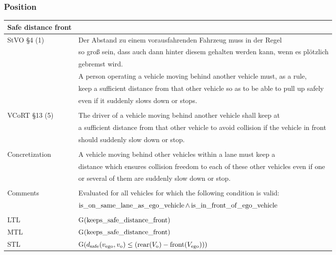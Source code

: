 \subsubsection{Position}
\begin{table}[H]
\centering
\begin{tabular}[t]{ll}
\toprule
\textbf{Safe distance front} & \\
\midrule
StVO \S 4 (1)& Der Abstand zu einem vorausfahrenden Fahrzeug muss in der Regel \\ 
& so groß sein, dass auch dann hinter diesem gehalten werden kann, wenn es plötzlich  \\
& gebremst wird.\\
& A person operating a vehicle moving behind another vehicle must, as a rule,\\
& keep a sufficient distance from that other vehicle so as to be able to pull up safely \\
& even if it suddenly slows down or stops. \\
&\\
VCoRT \S 13 (5) & The  driver  of  a  vehicle  moving  behind  another  vehicle  shall  keep  at \\ 
& a  sufficient distance from that other vehicle to avoid collision if the vehicle in front \\ 
& should suddenly slow down or stop. \\
&\\
Concretization &  A vehicle moving behind other vehicles within a lane must keep a \\ 
& distance which ensures collision freedom to each of these other vehicles even if one\\ 
&  or several of them are suddenly slow down or stop.\\
&\\
Comments &  Evaluated for all vehicles for which the following condition is valid: \\
& $\operatorname*{is\_on\_same\_lane\_as\_ego\_vehicle} \land \operatorname*{is\_in\_front\_of\_ego\_vehicle}$\\
&\\
LTL & G$(\operatorname*{keeps\_safe\_distance\_front})$\\
MTL & G$(\operatorname*{keeps\_safe\_distance\_front})$\\
STL & G$(d_\text{safe}(v_\text{ego}, v_\text{o}) \leq (\operatorname*{rear}(V_\text{o}) - \operatorname*{front}(V_\text{ego})))$\\
\bottomrule
\end{tabular}
\end{table}


